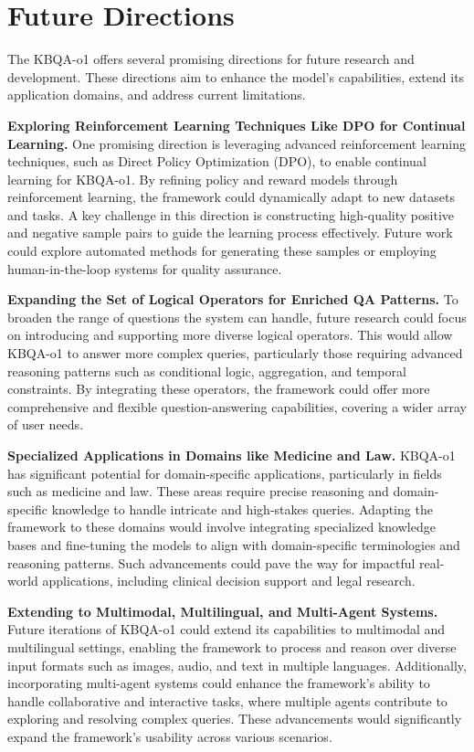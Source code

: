 \documentclass{article}
\theoremstyle{plain}
\theoremstyle{definition}
\theoremstyle{remark}
\begin{document}
\section{Future Directions}
\label{future}
The KBQA-o1 offers several promising directions for future research and development. These directions aim to enhance the model’s capabilities, extend its application domains, and address current limitations.

\textbf{Exploring Reinforcement Learning Techniques Like DPO for Continual Learning.} One promising direction is leveraging advanced reinforcement learning techniques, such as Direct Policy Optimization (DPO), to enable continual learning for KBQA-o1. By refining policy and reward models through reinforcement learning, the framework could dynamically adapt to new datasets and tasks. A key challenge in this direction is constructing high-quality positive and negative sample pairs to guide the learning process effectively. Future work could explore automated methods for generating these samples or employing human-in-the-loop systems for quality assurance.

\textbf{Expanding the Set of Logical Operators for Enriched QA Patterns.} To broaden the range of questions the system can handle, future research could focus on introducing and supporting more diverse logical operators. This would allow KBQA-o1 to answer more complex queries, particularly those requiring advanced reasoning patterns such as conditional logic, aggregation, and temporal constraints. By integrating these operators, the framework could offer more comprehensive and flexible question-answering capabilities, covering a wider array of user needs.

\textbf{Specialized Applications in Domains like Medicine and Law.} KBQA-o1 has significant potential for domain-specific applications, particularly in fields such as medicine and law. These areas require precise reasoning and domain-specific knowledge to handle intricate and high-stakes queries. Adapting the framework to these domains would involve integrating specialized knowledge bases and fine-tuning the models to align with domain-specific terminologies and reasoning patterns. Such advancements could pave the way for impactful real-world applications, including clinical decision support and legal research.

\textbf{Extending to Multimodal, Multilingual, and Multi-Agent Systems.} Future iterations of KBQA-o1 could extend its capabilities to multimodal and multilingual settings, enabling the framework to process and reason over diverse input formats such as images, audio, and text in multiple languages. Additionally, incorporating multi-agent systems could enhance the framework’s ability to handle collaborative and interactive tasks, where multiple agents contribute to exploring and resolving complex queries. These advancements would significantly expand the framework’s usability across various scenarios.

\end{document}
